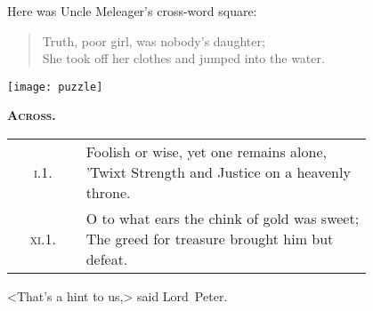 \vfill

Here was Uncle Meleager's cross-word square:

\begin{quote}
Truth, poor girl, was nobody's daughter;\\
She took off her clothes and jumped into the water.\\
\end{quote}

\begin{center}
\texttt{[image: puzzle]}
\end{center}

\pagebreak[2]

{\scshape\large\bfseries Across.}

\def\arraystretch{2.5}
	
\begin{longtable} {c p{0.8\linewidth}} 
\textsc{i}.1. & \makecell[l]{Foolish or wise, yet one remains alone,\\'Twixt Strength and Justice on a heavenly throne.}\\
\textsc{xi}.1. & \makecell[l]{O to what ears the chink of gold was sweet;\\
The greed for treasure brought him but defeat.}\\
\end{longtable}

<That's a hint to us,> said Lord~Peter.


